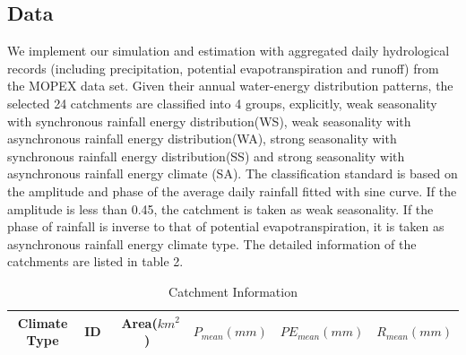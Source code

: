 \documentclass[draft,wrr]{AGUTeX}
\begin{document}
\begin{article}
\section{Data}
We implement our simulation and estimation with aggregated daily hydrological records (including precipitation, potential evapotranspiration and runoff) from the MOPEX data set\citep{duan2006model}. Given their annual water-energy distribution patterns, the selected 24 catchments are classified into 4 groups, explicitly, weak seasonality with synchronous rainfall energy distribution(WS), weak seasonality with asynchronous rainfall energy distribution(WA), strong seasonality with  synchronous rainfall energy distribution(SS) and strong seasonality with asynchronous rainfall energy climate (SA). The classification standard is based on the amplitude and phase of the average daily rainfall fitted with sine curve. If the amplitude is less than 0.45, the catchment is taken as weak seasonality. If the phase of rainfall is inverse to that of potential evapotranspiration, it is taken as asynchronous rainfall energy climate type. The detailed information of the catchments are listed in table 2. 
 
\begin{table}\scriptsize
\caption{Catchment Information} 
 
\begin{tabular}{cccccc}
\hline
Climate Type& ID &\ Area($km^2$)& $P_{mean}(mm)$& $PE_{mean}(mm)$&  $R_{mean}(mm)$  \\
\hline
 

\end{tabular}
\end{table}
\end{article}
\end{document}
